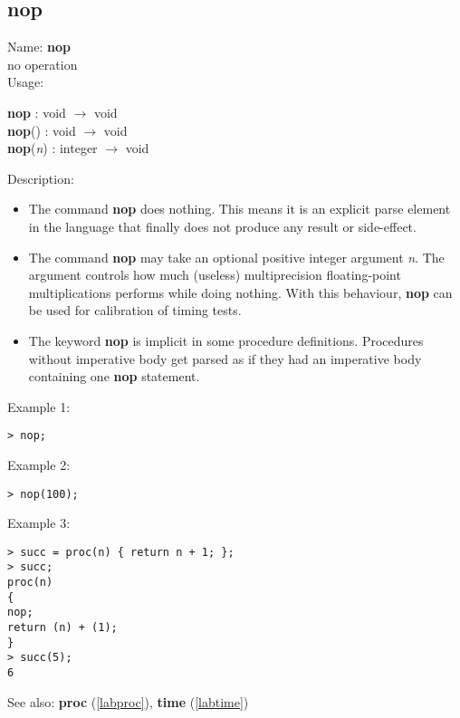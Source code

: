 \subsection{nop}
\label{labnop}
\noindent Name: \textbf{nop}\\
\phantom{aaa}no operation\\[0.2cm]
\noindent Usage: 
\begin{center}
\textbf{nop} : \textsf{void} $\rightarrow$ \textsf{void}\\
\textbf{nop}() : \textsf{void} $\rightarrow$ \textsf{void}\\
\textbf{nop}(\emph{n}) : \textsf{integer} $\rightarrow$ \textsf{void}\\
\end{center}
\noindent Description: \begin{itemize}

\item The command \textbf{nop} does nothing. This means it is an explicit parse
   element in the \sollya language that finally does not produce any
   result or side-effect.

\item The command \textbf{nop} may take an optional positive integer argument
   \emph{n}. The argument controls how much (useless) multiprecision
   floating-point multiplications \sollya performs while doing nothing.
   With this behaviour, \textbf{nop} can be used for calibration of timing
   tests.

\item The keyword \textbf{nop} is implicit in some procedure
   definitions. Procedures without imperative body get parsed as if they
   had an imperative body containing one \textbf{nop} statement.
\end{itemize}
\noindent Example 1: 
\begin{center}\begin{minipage}{15cm}\begin{Verbatim}[frame=single,commandchars=\\\|\~]
> nop;
\end{Verbatim}
\end{minipage}\end{center}
\noindent Example 2: 
\begin{center}\begin{minipage}{15cm}\begin{Verbatim}[frame=single,commandchars=\\\|\~]
> nop(100);
\end{Verbatim}
\end{minipage}\end{center}
\noindent Example 3: 
\begin{center}\begin{minipage}{15cm}\begin{Verbatim}[frame=single,commandchars=\\\|\~]
> succ = proc(n) { return n + 1; };
> succ;
proc(n)
{
nop;
return (n) + (1);
}
> succ(5);
6
\end{Verbatim}
\end{minipage}\end{center}
See also: \textbf{proc} (\ref{labproc}), \textbf{time} (\ref{labtime})
